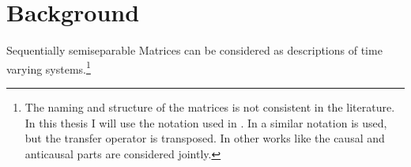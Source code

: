 \documentclass[numbers=noenddot,doctype=mastersthesis,BCOR=15mm,biblatex]{ldvbook}%
\begin{document}



\chapter{Background}\label{chap:background}


Sequentially semiseparable Matrices can be considered as descriptions of time varying systems.\footnote{
The naming and structure of the matrices is not consistent in the literature.
In this thesis I will use the notation used in \cite{tong_blind_2003}. 
In \cite{dewilde_time-varying_1998} a similar notation is used, but the transfer operator is transposed.
In other works like \cite{rice_efficient_2010,chandrasekaran_fast_2002} the causal and anticausal parts are considered jointly.
}
\end{document}
